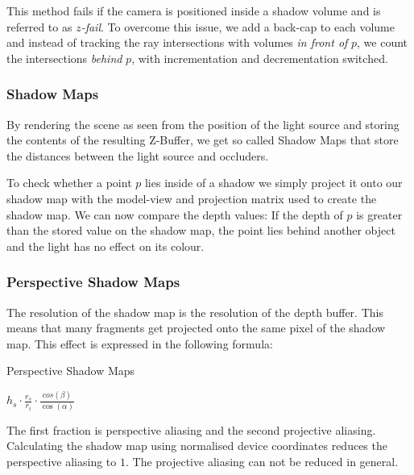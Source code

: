 \documentclass{panikzettel}
\begin{document}
This method fails if the camera is positioned inside a shadow volume and is referred to as \emph{$z$-fail}. To overcome this issue, we add a back-cap to each volume and instead of tracking the ray intersections with volumes \emph{in front of} $p$, we count the intersections \emph{behind} $p$, with incrementation and decrementation switched.

\subsubsection*{Shadow Maps}
By rendering the scene as seen from the position of the light source and storing the contents of the resulting Z-Buffer, we get so called Shadow Maps that store the distances between the light source and occluders.

To check whether a point $p$ lies inside of a shadow we simply project it onto our shadow map with the model-view and projection matrix used to create the shadow map. We can now compare the depth values: If the depth of $p$ is greater than the stored value on the shadow map, the point lies behind another object and the light has no effect on its colour.

\subsubsection*{Perspective Shadow Maps}
\label{subsubsec::perspectiveShadowMaps}

\begin{halfboxl}
The resolution of the shadow map is the resolution of the depth buffer. This means that many fragments get projected onto the same pixel of the shadow map. This effect is expressed in the following formula:
\end{halfboxl}
\begin{halfboxr}
\vspace{-\baselineskip}
\begin{defi}{Perspective Shadow Maps}
\begin{center}
    $h_s \cdot \frac{r_s}{r_i} \cdot \frac{cos(\beta)}{\cos(\alpha)}$
\end{center}
\end{defi}
\end{halfboxr}

The first fraction is perspective aliasing and the second projective aliasing. Calculating the shadow map using normalised device coordinates reduces the perspective aliasing to $1$. The projective aliasing can not be reduced in general.
\end{document}
